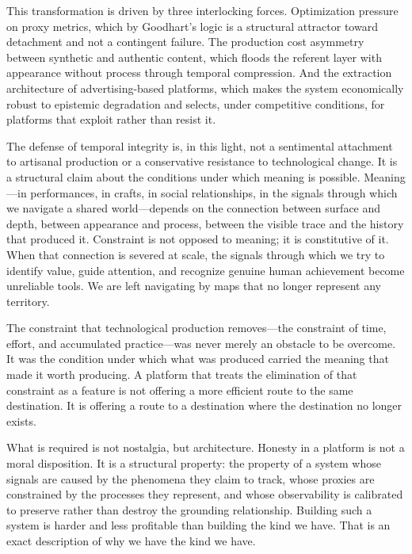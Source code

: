 \documentclass[12pt, a4paper]{article}
\begin{document}
This transformation is driven by three interlocking forces. Optimization pressure on proxy metrics, which by Goodhart's logic is a structural attractor toward detachment and not a contingent failure. The production cost asymmetry between synthetic and authentic content, which floods the referent layer with appearance without process through temporal compression. And the extraction architecture of advertising-based platforms, which makes the system economically robust to epistemic degradation and selects, under competitive conditions, for platforms that exploit rather than resist it.

The defense of temporal integrity is, in this light, not a sentimental attachment to artisanal production or a conservative resistance to technological change. It is a structural claim about the conditions under which meaning is possible. Meaning---in performances, in crafts, in social relationships, in the signals through which we navigate a shared world---depends on the connection between surface and depth, between appearance and process, between the visible trace and the history that produced it. Constraint is not opposed to meaning; it is constitutive of it. When that connection is severed at scale, the signals through which we try to identify value, guide attention, and recognize genuine human achievement become unreliable tools. We are left navigating by maps that no longer represent any territory.

The constraint that technological production removes---the constraint of time, effort, and accumulated practice---was never merely an obstacle to be overcome. It was the condition under which what was produced carried the meaning that made it worth producing. A platform that treats the elimination of that constraint as a feature is not offering a more efficient route to the same destination. It is offering a route to a destination where the destination no longer exists.

What is required is not nostalgia, but architecture. Honesty in a platform is not a moral disposition. It is a structural property: the property of a system whose signals are caused by the phenomena they claim to track, whose proxies are constrained by the processes they represent, and whose observability is calibrated to preserve rather than destroy the grounding relationship. Building such a system is harder and less profitable than building the kind we have. That is an exact description of why we have the kind we have.

\newpage
\end{document}
